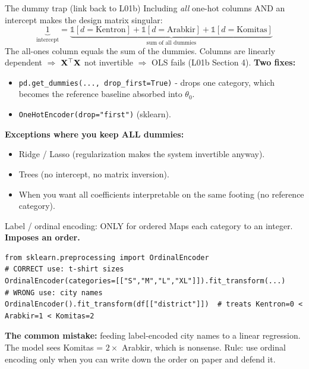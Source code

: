 \documentclass[aspectratio=169]{beamer}
\begin{document}
\begin{frame}{The dummy trap (link back to L01b)}
  Including \emph{all} one-hot columns AND an intercept makes the design matrix singular:
  \[
    \underbrace{1}_{\text{intercept}} = \underbrace{\mathds{1}[d{=}\text{Kentron}] + \mathds{1}[d{=}\text{Arabkir}] + \mathds{1}[d{=}\text{Komitas}]}_{\text{sum of all dummies}}
  \]
  The all-ones column equals the sum of the dummies. Columns are linearly dependent $\Rightarrow$ $\mathbf{X}^\top\mathbf{X}$ not invertible $\Rightarrow$ OLS fails (L01b Section 4).
  \vfill
  \textbf{Two fixes:}
  \begin{itemize}
    \item \texttt{pd.get\_dummies(..., drop\_first=True)} - drops one category, which becomes the reference baseline absorbed into $\theta_0$.
    \item \texttt{OneHotEncoder(drop="first")} (sklearn).
  \end{itemize}
  \vfill
  \textbf{Exceptions where you keep ALL dummies:}
  \begin{itemize}\small
    \item Ridge / Lasso (regularization makes the system invertible anyway).
    \item Trees (no intercept, no matrix inversion).
    \item When you want all coefficients interpretable on the same footing (no reference category).
  \end{itemize}
\end{frame}

\begin{frame}[fragile]{Label / ordinal encoding: ONLY for ordered}
  Maps each category to an integer. \textbf{Imposes an order.}
  \vfill
\begin{lstlisting}
from sklearn.preprocessing import OrdinalEncoder
# CORRECT use: t-shirt sizes
OrdinalEncoder(categories=[["S","M","L","XL"]]).fit_transform(...)
# WRONG use: city names
OrdinalEncoder().fit_transform(df[["district"]])  # treats Kentron=0 < Arabkir=1 < Komitas=2
\end{lstlisting}
  \vfill
  \textbf{The common mistake:} feeding label-encoded city names to a linear regression. The model sees Komitas = $2 \times$ Arabkir, which is nonsense.
  \vfill
  Rule: use ordinal encoding only when you can write down the order on paper and defend it.
\end{frame}
\end{document}
